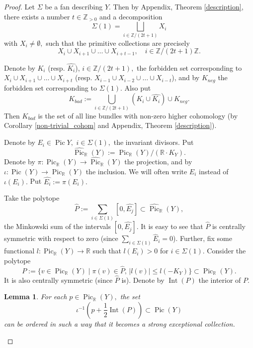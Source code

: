 \documentclass[11pt,leqno]{amsart}
\newtheorem{lemma}[theo]{Lemma}
\numberwithin{equation}{section}
\def\R{\mathbb{R}}
\def\Z{\mathbb{Z}}
\newcommand{\Int}{\operatorname{Int}}
\newcommand{\Pic}{\operatorname{Pic}}
\begin{document}
\begin{proof}Let $\Sigma$ be a fan describing $Y.$ Then by Appendix, Theorem \ref{description}, there exists a number $t\in\Z_{>0}$ and a decomposition
$$\Sigma(1)=\bigsqcup\limits_{i\in\Z/(2t+1)}X_i$$
with $X_i\ne\emptyset,$ such that the primitive collections are precisely
$$X_i\cup X_{i+1}\cup\dots\cup X_{i+t-1},\quad i\in\Z/(2t+1)\Z.$$

Denote by $K_i$ (resp. $\widehat{K_i}$), $i\in\Z/(2t+1),$ the forbidden set corresponding to $X_i\cup X_{i+1}\cup\dots\cup X_{i+t}$
(resp. $X_{i-1}\cup X_{i-2}\cup\dots\cup X_{i-t}$), and by $K_{neg}$ the forbidden set corresponding to $\Sigma(1).$ Also put
$$K_{bad}:=\bigcup\limits_{i\in\Z/(2t+1)}(K_i\cup\widehat{K_i})\cup K_{neg}.$$
Then $K_{bad}$ is the set of all line bundles with non-zero higher cohomology (by Corollary \ref{non-trivial_cohom} and Appendix, Theorem \ref{description}).

Denote by $E_i\in \Pic Y,$ $i\in\Sigma(1),$ the invariant divisors. Put $$\widehat{\Pic}_{\R}(Y):=\Pic_{\R}(Y)/(\R\cdot K_Y).$$
Denote by $\pi:\Pic_{\R}(Y)\to \widehat{\Pic}_{\R}(Y)$ the projection, and by $\iota:\Pic(Y)\to\Pic_{\R}(Y)$ the inclusion. We will often
write $E_i$ instead of $\iota(E_i).$
Put $\widehat{E_i}:=\pi(E_i).$

Take the polytope
\begin{equation}\widehat{P}:=\sum\limits_{i\in\Sigma(1)}[0,\widehat{E_j}]\subset \widehat{\Pic}_{\R}(Y),\end{equation}
the Minkowski sum of the intervals $[0,\widehat{E_j}].$ It is easy to see that $\widehat{P}$ is centrally symmetric
with respect to zero (since $\sum\limits_{i\in\Sigma(1)}\widehat{E}_i=0$).
 Further, fix some functional $l:\Pic_{\R}(Y)\to\R$ such that $l(E_i)>0$ for $i\in\Sigma(1).$ Consider the polytope
\begin{equation}P:=\{v\in\Pic_{\R}(Y)\mid \pi(v)\in\widehat{P},\,|l(v)|\leq l(-K_Y)\}\subset\Pic_{\R}(Y).\end{equation}
It is also centrally symmetric (since $\widehat{P}$ is).
Denote by $\Int(P)$ the interior of $P.$

\begin{lemma}\label{lots_coll}For each $p\in\Pic_{\R}(Y),$ the set
$$\iota^{-1}(p+\frac12 \Int(P))\subset\Pic(Y)$$ can be ordered in such a way that it becomes a strong exceptional collection.\end{lemma}


\end{proof}
\end{document}

